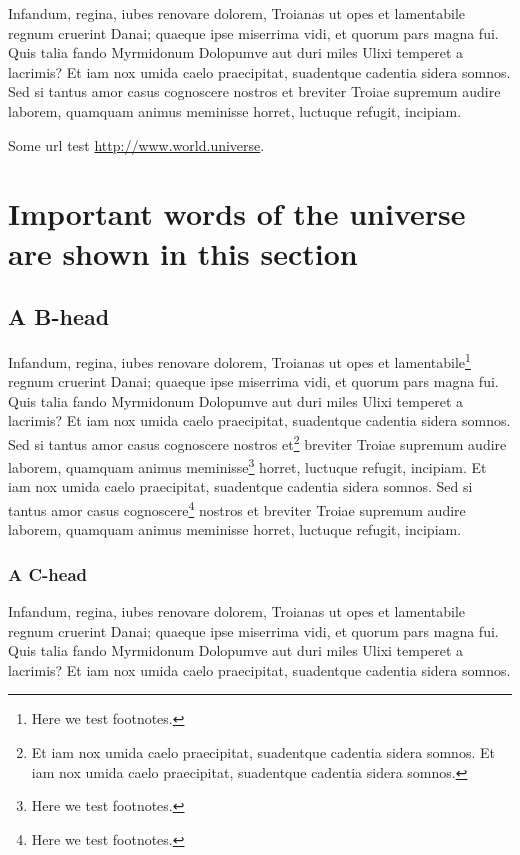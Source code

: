 \documentclass[
   \selectedoptions
  ]
  {aipproc}
\begin{document}
Infandum, regina, iubes renovare dolorem, Troianas ut opes et
lamentabile regnum cruerint Danai; quaeque ipse miserrima vidi, et
quorum pars magna fui. Quis talia fando Myrmidonum Dolopumve aut duri
miles Ulixi temperet a lacrimis? Et iam nox umida caelo praecipitat,
suadentque cadentia sidera somnos. Sed si tantus amor casus
cognoscere nostros et breviter Troiae supremum audire laborem,
quamquam animus meminisse horret, luctuque refugit, incipiam.

Some url test \url{http://www.world.universe}.

\section{Important words of the universe are shown in this section}

\subsection{A B-head}

Infandum, regina, iubes renovare dolorem, Troianas ut opes et
lamentabile\footnote{Here we test footnotes.} regnum cruerint Danai;
quaeque ipse miserrima vidi, et quorum pars magna fui. Quis talia
fando Myrmidonum Dolopumve aut duri miles Ulixi temperet a
lacrimis? Et iam nox umida caelo praecipitat, suadentque cadentia
sidera somnos. Sed si tantus amor casus cognoscere nostros
et\footnote{Et iam nox umida caelo praecipitat, suadentque cadentia
sidera somnos. Et iam nox umida caelo praecipitat, suadentque cadentia
sidera somnos.} breviter Troiae supremum audire laborem, quamquam
animus meminisse\footnote{Here we test footnotes.} horret, luctuque
refugit, incipiam.  Et iam nox umida caelo praecipitat, suadentque
cadentia sidera somnos. Sed si tantus amor casus
cognoscere\footnote{Here we test footnotes.} nostros et breviter Troiae
supremum audire laborem, quamquam animus meminisse horret,
luctuque refugit, incipiam.

\subsubsection{A C-head}

Infandum, regina, iubes renovare dolorem, Troianas ut opes et
lamentabile regnum cruerint Danai; quaeque ipse miserrima vidi, et
quorum pars magna fui. Quis talia fando Myrmidonum Dolopumve aut duri
miles Ulixi temperet a lacrimis? Et iam nox umida caelo praecipitat,
suadentque cadentia sidera somnos. 
\end{document}
